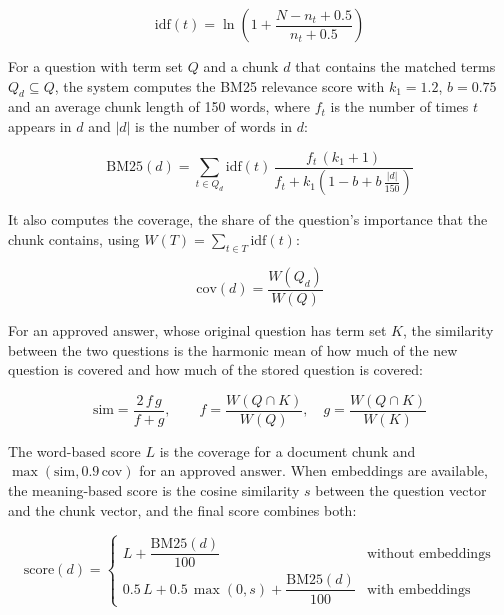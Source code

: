 \begin{equation} \label{eq:idf}
    \mathrm{idf}(t) = \ln\!\left(1 + \frac{N - n_t + 0.5}{n_t + 0.5}\right)
\end{equation}

For a question with term set $Q$ and a chunk $d$ that contains the matched terms $Q_d \subseteq Q$, the system computes the BM25 relevance score with $k_1 = 1.2$, $b = 0.75$ and an average chunk length of 150 words, where $f_t$ is the number of times $t$ appears in $d$ and $|d|$ is the number of words in $d$:

\begin{equation} \label{eq:bm25}
    \mathrm{BM25}(d) = \sum_{t \in Q_d} \mathrm{idf}(t)\,\frac{f_t\,(k_1 + 1)}{f_t + k_1\left(1 - b + b\,\frac{|d|}{150}\right)}
\end{equation}

It also computes the coverage, the share of the question's importance that the chunk contains, using $W(T) = \sum_{t \in T} \mathrm{idf}(t)$:

\begin{equation} \label{eq:coverage}
    \mathrm{cov}(d) = \frac{W(Q_d)}{W(Q)}
\end{equation}

For an approved answer, whose original question has term set $K$, the similarity between the two questions is the harmonic mean of how much of the new question is covered and how much of the stored question is covered:

\begin{equation} \label{eq:similarity}
    \mathrm{sim} = \frac{2\,f\,g}{f + g}, \qquad f = \frac{W(Q \cap K)}{W(Q)}, \quad g = \frac{W(Q \cap K)}{W(K)}
\end{equation}

The word-based score $L$ is the coverage for a document chunk and $\max(\mathrm{sim}, 0.9\,\mathrm{cov})$ for an approved answer. When embeddings are available, the meaning-based score is the cosine similarity $s$ between the question vector and the chunk vector, and the final score combines both:

\begin{equation} \label{eq:score}
    \mathrm{score}(d) = \begin{cases} L + \dfrac{\mathrm{BM25}(d)}{100} & \text{without embeddings} \\[2ex] 0.5\,L + 0.5\,\max(0, s) + \dfrac{\mathrm{BM25}(d)}{100} & \text{with embeddings} \end{cases}
\end{equation}

